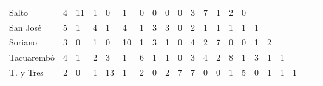 \begin{table}
\begin{tabular}{lp{0.7cm}p{0.7cm}p{0.7cm}p{0.7cm}p{0.7cm}p{0.7cm}p{0.7cm}p{0.7cm}p{0.7cm}p{0.7cm}p{0.7cm}p{0.7cm}p{0.7cm}p{0.7cm}p{0.7cm}p{0.7cm}p{0.7cm}p{0.7cm}p{0.7cm}p{0.7cm}}
Salto        &   4 & 11 &  1 &  0 &  1 &  0 &  0 &  0 &  0 &   3 &   7 &   1 &   2 &   0 &     &     &     &     \\
San José     &   5 &  1 &  4 &  1 &  4 &  1 &  3 &  3 &  0 &   2 &   1 &   1 &   1 &   1 &   1 &     &     &     \\
Soriano      &   3 &  0 &  1 &  0 & 10 &  1 &  3 &  1 &  0 &   4 &   2 &   7 &   0 &   0 &   1 &   2 &     &     \\
Tacuarembó   &   4 &  1 &  2 &  3 &  1 &  6 &  1 &  1 &  0 &   3 &   4 &   2 &   8 &   1 &   3 &   1 &   1 &     \\
T. y Tres    &   2 &  0 &  1 & 13 &  1 &  2 &  0 &  2 &  7 &   7 &   0 &   0 &   1 &   5 &   0 &   1 &   1 &   1 \\
\bottomrule
\end{tabular}
\end{table}

